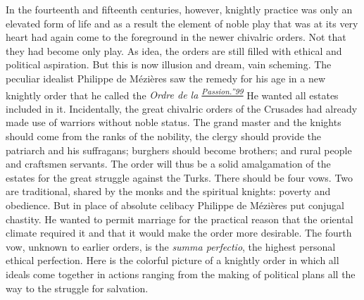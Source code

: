 In the fourteenth and fifteenth centuries, however, knightly practice
was only an elevated form of life and as a result the element of noble
play that was at its very heart had again come to the foreground in the
newer chivalric orders. Not that they had become only play. As idea, the
orders are still filled with ethical and political aspiration. But this
is now illusion and dream, vain scheming. The peculiar idealist Philippe
de Mézières saw the remedy for his age in a new knightly order that he
called the \emph{Ordre de la
\textsuperscript{\protect\hypertarget{10_Chapter_Three__THE_HEROIC_DREAM.xhtmlux5cux23id_1737}{\protect\hyperlink{23_NOTES.xhtmlux5cux23id_1738}{Passion.''99}}}}
He wanted all estates included in it. Incidentally, the great chivalric
orders of the Crusades had already made use of warriors without noble
status. The grand master and the knights should come from the ranks of
the nobility, the clergy should provide the patriarch and his
suffragans; burghers should become brothers; and rural people and
craftsmen servants. The order will thus be a solid amalgamation of the
estates for the great struggle against the Turks. There should be four
vows. Two are traditional, shared by the monks and the spiritual
knights: poverty and obedience. But in place of absolute celibacy
Philippe de Mézières put conjugal chastity. He wanted to permit marriage
for the practical reason that the oriental climate required it and that
it would make the order more
\protect\hypertarget{10_Chapter_Three__THE_HEROIC_DREAM.xhtmlux5cux23page_93}{}{}desirable.
The fourth vow, unknown to earlier orders, is the \emph{summa
perfectio}, the highest personal ethical perfection. Here is the
colorful picture of a knightly order in which all ideals come together
in actions ranging from the making of political plans all the way to the
struggle for salvation.

